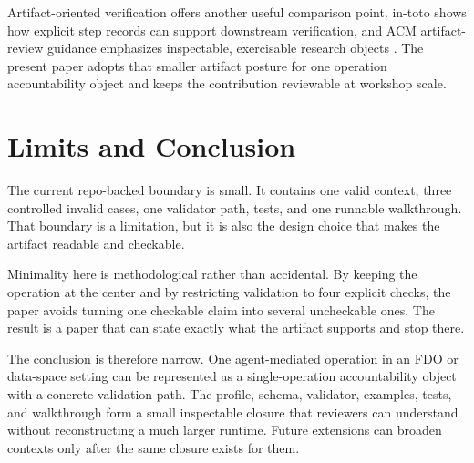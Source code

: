 \documentclass[conference]{IEEEtran}
\begin{document}
Artifact-oriented verification offers another useful comparison point. in-toto shows how explicit step records can support downstream verification, and ACM artifact-review guidance emphasizes inspectable, exercisable research objects \cite{torresarias2019intoto,acm2020artifactbadging}. The present paper adopts that smaller artifact posture for one operation accountability object and keeps the contribution reviewable at workshop scale.

\section{Limits and Conclusion}

The current repo-backed boundary is small. It contains one valid context, three controlled invalid cases, one validator path, tests, and one runnable walkthrough. That boundary is a limitation, but it is also the design choice that makes the artifact readable and checkable.

Minimality here is methodological rather than accidental. By keeping the operation at the center and by restricting validation to four explicit checks, the paper avoids turning one checkable claim into several uncheckable ones. The result is a paper that can state exactly what the artifact supports and stop there.

The conclusion is therefore narrow. One agent-mediated operation in an FDO or data-space setting can be represented as a single-operation accountability object with a concrete validation path. The profile, schema, validator, examples, tests, and walkthrough form a small inspectable closure that reviewers can understand without reconstructing a much larger runtime. Future extensions can broaden contexts only after the same closure exists for them.

\balance



\end{document}
